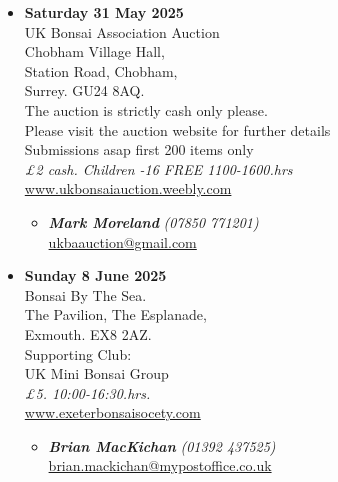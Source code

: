 \begin{itemize}
    \item \textbf{Saturday 31 May 2025}
    \\
    UK Bonsai Association Auction \\
    Chobham Village Hall, \\
    Station Road, Chobham, \\
    Surrey. GU24 8AQ. \\
    The auction is strictly cash only please. \\
    Please visit the auction website for further details \\
    Submissions asap first 200 items only
    \\
    \emph{£2 cash. Children -16 FREE 1100-1600.hrs}
    \\
    \href{https://www.ukbonsaiauction.weebly.com}{www.ukbonsaiauction.weebly.com}
    \begin{itemize}
        \item \textbf{\emph{Mark Moreland}} \emph{(07850 771201)} \\
        \href{mailto:ukbaauction@gmail.com}{ukbaauction@gmail.com} 
    \end{itemize}

    \item \textbf{Sunday 8 June 2025}
    \\
    Bonsai By The Sea. \\
    The Pavilion, The Esplanade, \\
    Exmouth. EX8 2AZ. \\
    Supporting Club: \\
    UK Mini Bonsai Group
    \\
    \emph{£5. 10:00-16:30.hrs.}
    \\
    \href{http://www.exeterbonsaisocety.com/}{www.exeterbonsaisocety.com}
    \begin{itemize}
        \item \textbf{\emph{Brian MacKichan}} \emph{(01392 437525)} \\
        \href{mailto:brian.mackichan@mypostoffice.co.uk}{brian.mackichan@mypostoffice.co.uk} 
    \end{itemize}


\end{itemize}
